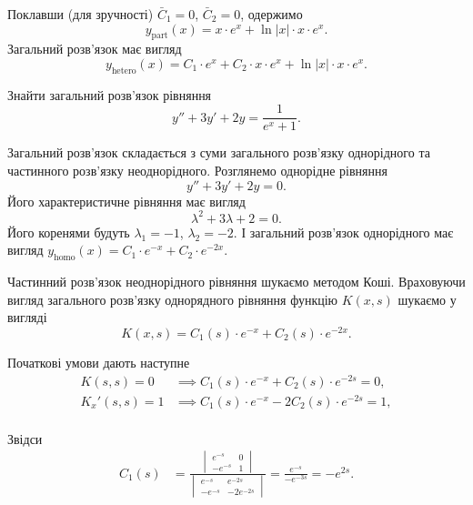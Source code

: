 \begin{solution}
	Поклавши (для зручності) $\bar C_1 = 0$, $\bar C_2 = 0$, одержимо
	\begin{equation*}
		y_{\text{part}}(x) = x \cdot e^x + \ln |x| \cdot x \cdot e^x.
	\end{equation*}
	Загальний розв'язок має вигляд
	\begin{equation*}
		y_{\text{hetero}}(x) = C_1 \cdot e^x + C_2 \cdot x \cdot e^x + \ln |x| \cdot x \cdot e^x.
	\end{equation*}
\end{solution}

\begin{example}
	Знайти загальний розв'язок рівняння \[y'' + 3 y' + 2 y = \frac{1}{e^x + 1}.\]
\end{example}
\begin{solution}
	Загальний розв'язок складається з суми загального роз\-в'яз\-ку однорідного та частинного роз\-в'яз\-ку неоднорідного. Розглянемо однорідне рівняння
	\begin{equation*}
		y'' + 3 y ' + 2 y = 0.
	\end{equation*}
	Його характеристичне рівняння має вигляд
	\begin{equation*}
		\lambda^2 + 3 \lambda + 2 = 0.
	\end{equation*}
	Його коренями будуть $\lambda_1 = - 1$, $\lambda_2 = -2$. І загальний розв'язок однорідного має вигляд $y_{\text{homo}}(x) = C_1 \cdot e^{-x} + C_2 \cdot e^{-2x}$. \parvskip

	Частинний розв'язок неоднорідного рівняння шукаємо методом Коші. Враховуючи вигляд загального роз\-в'яз\-ку однорядного рівняння функцію $K(x, s)$ шукаємо у вигляді
	\begin{equation*}
		K(x, s) = C_1(s) \cdot e^{-x} + C_2(s) \cdot e^{-2x}.
	\end{equation*}

	Початкові умови дають наступне
	\begin{align*}
		K(s, s) = 0 &\implies C_1(s) \cdot e^{-x} + C_2(s) \cdot e^{-2s} = 0, \\
		K_x'(s, s) = 1 &\implies C_1(s) \cdot e^{-x} - 2 C_2(s) \cdot e^{-2s} = 1, \\
	\end{align*}

	Звідси
	\begin{align*}
		C_1(s) &= \frac{\begin{vmatrix} e^{-s} & 0 \\ -e^{-s} & 1 \end{vmatrix}}{\begin{vmatrix} e^{-s} & e^{-2s} \\ -e^{-s} & -2e^{-2s} \end{vmatrix}} = \frac{e^{-s}}{-e^{-3s}} = -e^{2s}.
	\end{align*}


\end{solution}
